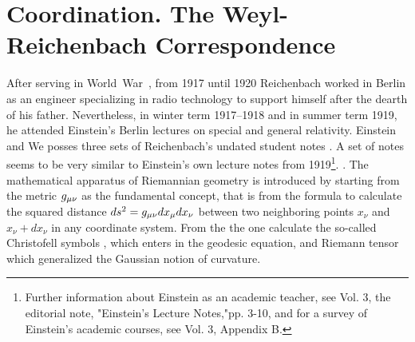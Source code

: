 \documentclass[draft]{article}
\newcommand{\xdx}{\ensuremath{x_\nu} and \ensuremath{x_\nu + dx_\nu}\xspace}
\begin{document}
\section{Coordination. The Weyl-Reichenbach Correspondence}
\label{Coordination}




After serving in World~War~, from 1917 until 1920 Reichenbach worked in Berlin as an engineer specializing in radio technology to support himself after the dearth of his father. Nevertheless, in winter term 1917--1918 and in summer term 1919, he attended Einstein's Berlin lectures on special and general relativity. Einstein and  We posses three sets of Reichenbach's undated student notes \citep[028-01-04, 028-01-03, 028-01-01]{HR}. A set of notes \citep[028-01-01]{HR} seems to be very similar to Einstein's own lecture notes from 1919\citep{Einstein1919c}\footnote{Further information about Einstein as an academic teacher, see Vol. 3, the editorial note, "Einstein's Lecture Notes,"pp. 3-10, and for a survey of Einstein's academic courses, see Vol. 3, Appendix B.}. . The mathematical apparatus of Riemannian geometry is introduced by starting from the metric $g_{\mu\nu}$ as the fundamental concept, that is from the formula to calculate the squared distance $ds^2=g_{\mu\nu} dx_\mu dx_\nu$ between two neighboring points \xdx in any coordinate system. From the \gmn the one calculate the so-called Christofell symbols \christoffel{\mu}{\nu}{\tau}, which enters in the geodesic equation, and Riemann tensor \rite which generalized the Gaussian notion of curvature. 
\end{document}
